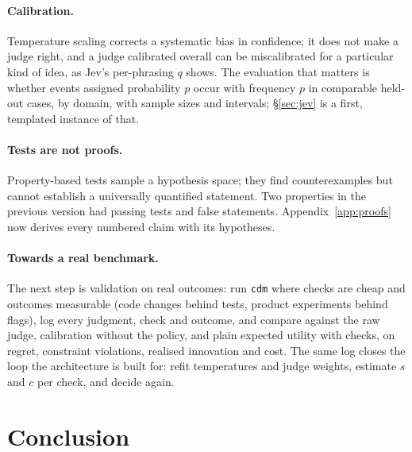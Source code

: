 \documentclass[11pt]{article}
\theoremstyle{definition}
\begin{document}
\paragraph{Calibration.} Temperature scaling corrects a systematic bias in confidence; it does not
make a judge right, and a judge calibrated overall can be miscalibrated for a particular kind of
idea, as Jev's per-phrasing $q$ shows. The evaluation that matters is whether events assigned
probability $p$ occur with frequency $p$ in comparable held-out cases, by domain, with sample sizes
and intervals; \S\ref{sec:jev} is a first, templated instance of that.

\paragraph{Tests are not proofs.} Property-based tests sample a hypothesis space; they find
counterexamples but cannot establish a universally quantified statement. Two properties in the
previous version had passing tests and false statements. Appendix~\ref{app:proofs} now derives every
numbered claim with its hypotheses.

\paragraph{Towards a real benchmark.} The next step is validation on real outcomes: run
\texttt{cdm} where checks are cheap and outcomes measurable (code changes behind tests, product
experiments behind flags), log every judgment, check and outcome, and compare against the raw
judge, calibration without the policy, and plain expected utility with checks, on regret,
constraint violations, realised innovation and cost. The same log closes the loop the architecture is
built for: refit temperatures and judge weights, estimate $s$ and $c$ per check, and decide again.

\section{Conclusion}
\end{document}
